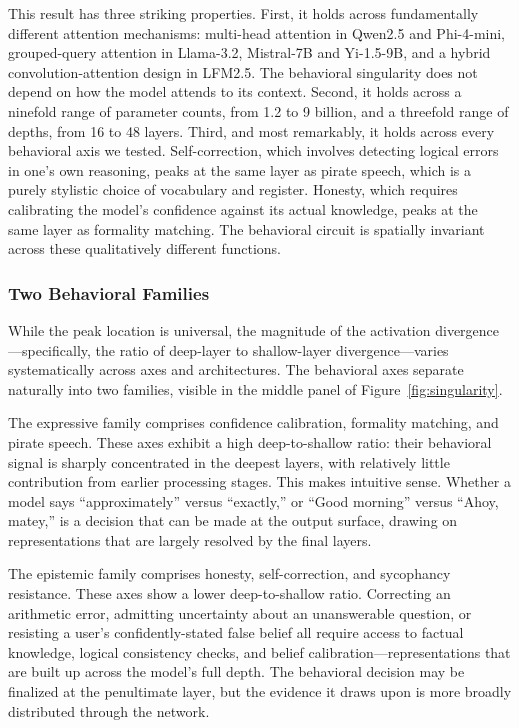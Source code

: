 \documentclass[11pt,a4paper]{article}
\begin{document}
This result has three striking properties. First, it holds across fundamentally different attention mechanisms: multi-head attention in Qwen2.5 and Phi-4-mini, grouped-query attention in Llama-3.2, Mistral-7B and Yi-1.5-9B, and a hybrid convolution-attention design in LFM2.5. The behavioral singularity does not depend on how the model attends to its context. Second, it holds across a ninefold range of parameter counts, from 1.2 to 9 billion, and a threefold range of depths, from 16 to 48 layers. Third, and most remarkably, it holds across every behavioral axis we tested. Self-correction, which involves detecting logical errors in one's own reasoning, peaks at the same layer as pirate speech, which is a purely stylistic choice of vocabulary and register. Honesty, which requires calibrating the model's confidence against its actual knowledge, peaks at the same layer as formality matching. The behavioral circuit is spatially invariant across these qualitatively different functions.

\subsubsection{Two Behavioral Families}

While the peak location is universal, the magnitude of the activation divergence---specifically, the ratio of deep-layer to shallow-layer divergence---varies systematically across axes and architectures. The behavioral axes separate naturally into two families, visible in the middle panel of Figure~\ref{fig:singularity}.

The expressive family comprises confidence calibration, formality matching, and pirate speech. These axes exhibit a high deep-to-shallow ratio: their behavioral signal is sharply concentrated in the deepest layers, with relatively little contribution from earlier processing stages. This makes intuitive sense. Whether a model says ``approximately'' versus ``exactly,'' or ``Good morning'' versus ``Ahoy, matey,'' is a decision that can be made at the output surface, drawing on representations that are largely resolved by the final layers.

The epistemic family comprises honesty, self-correction, and sycophancy resistance. These axes show a lower deep-to-shallow ratio. Correcting an arithmetic error, admitting uncertainty about an unanswerable question, or resisting a user's confidently-stated false belief all require access to factual knowledge, logical consistency checks, and belief calibration---representations that are built up across the model's full depth. The behavioral decision may be finalized at the penultimate layer, but the evidence it draws upon is more broadly distributed through the network.
\end{document}
